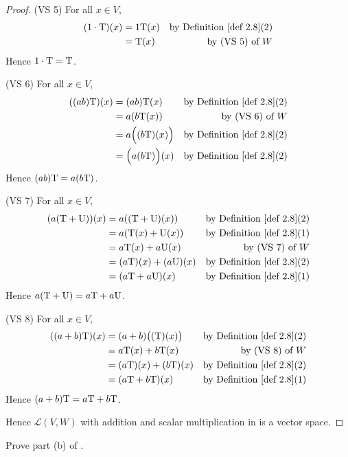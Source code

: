 \begin{proof}
(VS 5) For all \(x \in V\),
\begin{align*}
    (1 \cdot \T)(x) & = 1 \T(x) & \text{by \DEF{2.8}(2)} \\
                    & = \T(x) & \text{by (VS 5) of \(W\)}
\end{align*}
Hence \(1 \cdot \mathrm{T} = \mathrm{T}\).

(VS 6) For all \(x \in V\),
\begin{align*}
    ((ab)\T)(x) & = (ab)\T(x) & \text{by \DEF{2.8}(2)} \\
                & = a(b\T(x)) & \text{by (VS 6) of \(W\)} \\
                & = a\Big( (b\T)(x) \Big) & \text{by \DEF{2.8}(2)} \\
                & = \Big( a(b\T) \Big)(x) & \text{by \DEF{2.8}(2)}
\end{align*}
Hence \((ab)\mathrm{T} = a(b\mathrm{T})\).

(VS 7) For all \(x \in V\),
\begin{align*}
    (a(\T + \U))(x) & = a((\T + \U)(x)) & \text{by \DEF{2.8}(2)} \\
                    & = a(\T(x) + \U(x)) & \text{by \DEF{2.8}(1)} \\
                    & = a\T(x) + a\U(x) & \text{by (VS 7) of \(W\)} \\
                    & = (a\T)(x) + (a\U)(x) & \text{by \DEF{2.8}(2)} \\
                    & = (a\T + a\U)(x) & \text{by \DEF{2.8}(1)}
\end{align*}
Hence \(a(\mathrm{T} + \mathrm{U}) = a\mathrm{T} + a\mathrm{U}\).

(VS 8) For all \(x \in V\),
\begin{align*}
    ((a + b)\T)(x) & = (a + b)\big( (\T)(x) \big) & \text{by \DEF{2.8}(2)} \\
                    & = a\T(x) + b\T(x) & \text{by (VS 8) of \(W\)} \\
                    & = (a\T)(x) + (b\T)(x) & \text{by \DEF{2.8}(2)} \\
                    & = (a\T + b\T)(x) & \text{by \DEF{2.8}(1)}
\end{align*}
Hence \((a + b)\mathrm{T} = a\mathrm{T} + b\mathrm{T}\).

Hence \(\mathcal{L}(V, W)\) with addition and scalar multiplication in  is a vector space.
\end{proof}

\begin{exercise} \label{exercise 2.2.7}
Prove part (b) of .
\end{exercise}

